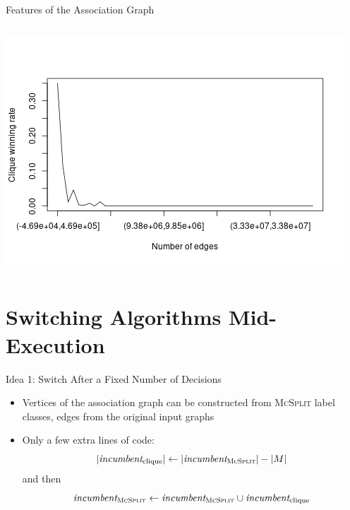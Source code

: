 \documentclass{beamer}
\begin{document}
\begin{frame}{Features of the Association Graph}
\begin{columns}
\begin{column}{0.5\textwidth}
      \includegraphics[width=\textwidth,height=0.4\textheight,keepaspectratio]{../dissertation/images/edges_bins.png}
    \end{column}
  \end{columns}
\end{frame}

\section{Switching Algorithms Mid-Execution}

\begin{frame}{Idea 1: Switch After a Fixed Number of Decisions}
  \pause
  \begin{itemize}
  \item Vertices of the association graph can be constructed from \textsc{McSplit}
    label classes, edges from the original input graphs
  \item Only a few extra lines of code:
    \[ |\textit{incumbent}_{\text{clique}}| \gets
      |\textit{incumbent}_{\text{\textsc{McSplit}}}| - |M| \]
    and then
    \[ \textit{incumbent}_{\textsc{McSplit}} \gets
      \textit{incumbent}_{\textsc{McSplit}} \cup
      \textit{incumbent}_{\text{clique}} \]
  \end{itemize}
\end{frame}
\end{document}
